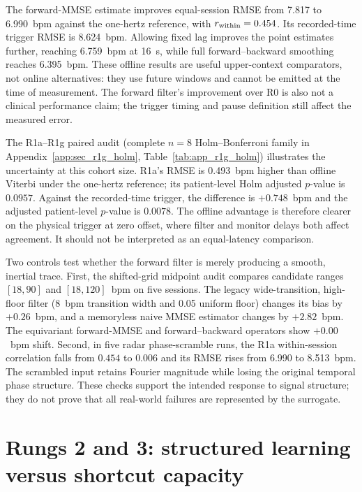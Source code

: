 The forward-MMSE estimate improves equal-session RMSE from 7.817 to 6.990~bpm against the
one-hertz reference, with $r_{\mathrm{within}}=0.454$. Its recorded-time trigger RMSE is 8.624~bpm. Allowing
fixed lag improves the point estimates further, reaching 6.759~bpm at 16~s, while full
forward--backward smoothing reaches 6.395~bpm. These offline results are useful upper-context
comparators, not online alternatives: they use future windows and cannot be emitted at the time
of measurement. The forward filter's improvement over R0 is also not a clinical performance
claim; the trigger timing and pause definition still affect the measured error.

The R1a--R1g paired audit (complete $n=8$ Holm--Bonferroni family in Appendix~\ref{app:sec_r1g_holm}, Table~\ref{tab:app_r1g_holm}) illustrates the uncertainty at this cohort size. R1a's RMSE is
0.493~bpm higher than offline Viterbi under the one-hertz reference; its patient-level Holm
adjusted $p$-value is $0.0957$. Against the recorded-time trigger, the difference is
$+0.748$~bpm and the adjusted patient-level $p$-value is $0.0078$. The offline advantage is
therefore clearer on the physical trigger at zero offset, where filter and monitor delays both
affect agreement. It should not be interpreted as an equal-latency comparison.

Two controls test whether the forward filter is merely producing a smooth, inertial trace. First,
the shifted-grid midpoint audit compares candidate ranges $[18,90]$ and $[18,120]$~bpm on five
sessions. The legacy wide-transition, high-floor filter (8~bpm transition width and 0.05 uniform floor) changes its bias by $+0.26$~bpm, and a memoryless naive
MMSE estimator changes by $+2.82$~bpm. The equivariant forward-MMSE and forward--backward
operators show $+0.00$~bpm shift. Second, in five radar phase-scramble runs, the R1a
within-session correlation falls from $0.454$ to $0.006$ and its RMSE rises from 6.990 to
8.513~bpm. The scrambled input retains Fourier magnitude while losing the original temporal
phase structure. These checks support the intended response to signal structure; they do not
prove that all real-world failures are represented by the surrogate.

\section{Rungs 2 and 3: structured learning versus shortcut capacity}
\label{sec:ch4_complexity}

